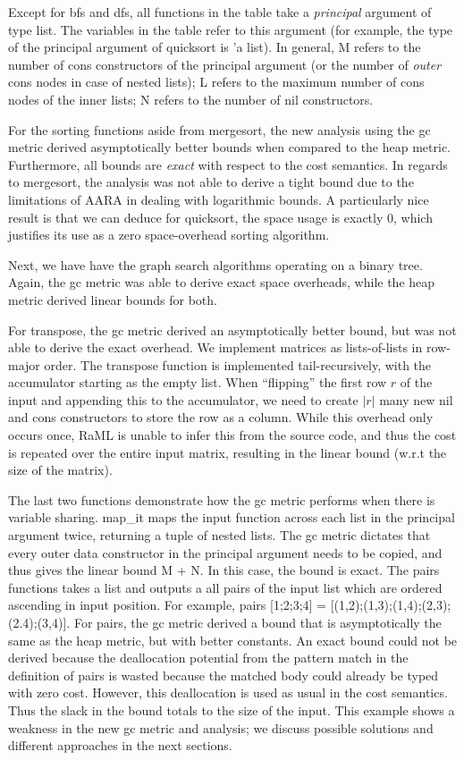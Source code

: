 \documentclass{easychair}
\theoremstyle{definition}
\begin{document}
Except for bfs and dfs, all functions in the table take a \emph{principal} argument of type list. 
The variables in the table refer to this argument (for example, the type of the 
principal argument of 
quicksort is 'a list). In general, M refers to the number of cons constructors of the principal 
argument (or the number of \emph{outer} cons nodes in case of nested lists); L refers to the
maximum number of cons nodes of the inner lists; N refers to the number of nil constructors.

For the sorting functions aside from mergesort, the new analysis using the gc metric
derived asymptotically better bounds when compared to the heap metric. Furthermore,
all bounds are \emph{exact} with respect to the cost semantics. In regards to mergesort, 
the analysis was not able to derive a tight bound due to the limitations of AARA in dealing 
with logarithmic bounds. A particularly nice result is that we can deduce for quicksort, 
the space usage is exactly 0, which justifies its use as a zero space-overhead sorting algorithm.

Next, we have have the graph search algorithms operating on a binary tree. Again, the gc metric
was able to derive exact space overheads, while the heap metric derived linear bounds for both.

For transpose, the gc metric derived an asymptotically better bound, but was not able to derive 
the exact overhead. We implement matrices as lists-of-lists in row-major order. 
The transpose function is implemented tail-recursively, with the accumulator starting as the 
empty list. When ``flipping'' the first row $r$ of the input and appending this to the accumulator, 
we need to create $|r|$ many new nil and cons constructors to store the row as a column. While this
overhead only occurs once, RaML is unable to infer this from the source code, and thus the cost
is repeated over the entire input matrix, resulting in the linear bound (w.r.t the size of the 
matrix). 

The last two functions demonstrate how the gc metric performs when there is variable sharing.
map\_it maps the input function across each list in the principal argument twice, returning a
tuple of nested lists. The gc metric dictates that every outer data constructor in the 
principal argument needs to be copied, and thus gives the linear bound M + N. In this case,
the bound is exact. The pairs functions takes a list and outputs a all pairs of the input list 
which are ordered ascending in input position. For example, 
pairs [1;2;3;4] = [(1,2);(1,3);(1,4);(2,3);(2.4);(3,4)]. For pairs, the gc metric derived a bound
that is asymptotically the same as the heap metric, but with better constants. An exact bound 
could not be derived because the deallocation potential from the pattern match in the 
definition of pairs is wasted because the matched body could already be typed with zero cost. 
However, this deallocation is used as usual in the cost semantics. Thus the slack in the bound 
totals to the size of the input. This example shows a weakness in the new gc metric and analysis; 
we discuss possible solutions and different approaches in the next sections. 
\end{document}
